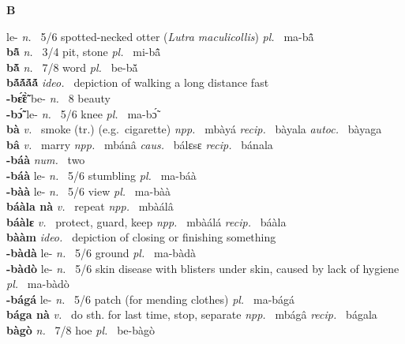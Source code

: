 \medskip
\noindent \large {\bfseries B}\normalsize\\
\medskip

 le- {\itshape n.~} 5/6 spotted-necked otter ({\itshape Lutra maculicollis}) {\itshape pl.~} ma-bã̂    \\ 
{\bfseries  bã̂}  {\itshape n.~} 3/4 pit, stone {\itshape pl.~} mi-bã̂    \\ 
{\bfseries  bã̌}  {\itshape n.~} 7/8 word {\itshape pl.~} be-bã̌    \\ 
{\bfseries bã́ã́ã́ã́}  {\itshape ideo.~} depiction of walking a long distance fast    \\ 
{\bfseries -bɛ̃́ɛ̃̀} be- {\itshape n.~} 8 beauty    \\ 
{\bfseries -bɔ̃́} le- {\itshape n.~} 5/6 knee {\itshape pl.~} ma-bɔ̃́   \\ 
{\bfseries bà}  {\itshape v.~} smoke (tr.) (e.g.\ cigarette)   {\itshape npp.~} mbàyá {\itshape recip.~} bàyala {\itshape autoc.~} bàyaga \\ 
{\bfseries bâ}  {\itshape v.~} marry   {\itshape npp.~} mbánâ {\itshape caus.~} bálɛsɛ {\itshape recip.~} bánala  \\ 
{\bfseries -báà}  {\itshape num.~} two    \\ 
{\bfseries -báà} le- {\itshape n.~} 5/6 stumbling {\itshape pl.~} ma-báà    \\ 
{\bfseries -bàà} le- {\itshape n.~} 5/6 view {\itshape pl.~} ma-bàà    \\ 
{\bfseries báàla nà}  {\itshape v.~} repeat   {\itshape npp.~} mbàálâ  \\ 
{\bfseries báàlɛ}  {\itshape v.~} protect, guard, keep   {\itshape npp.~} mbàálá {\itshape recip.~} báàla  \\ 
{\bfseries bààm}  {\itshape ideo.~} depiction of closing or finishing something    \\ 
{\bfseries -bàdà} le- {\itshape n.~} 5/6 ground {\itshape pl.~} ma-bàdà    \\ 
{\bfseries -bàdò} le- {\itshape n.~} 5/6 skin disease with blisters under skin, caused by lack of hygiene {\itshape pl.~} ma-bàdò    \\ 
{\bfseries -bágá} le- {\itshape n.~} 5/6 patch (for mending clothes) {\itshape pl.~} ma-bágá    \\ 
{\bfseries bága nà}  {\itshape v.~} do sth. for last time, stop, separate   {\itshape npp.~} mbágâ {\itshape recip.~} bágala  \\ 
{\bfseries bàgò}  {\itshape n.~} 7/8 hoe {\itshape pl.~} be-bàgò    \\ 
